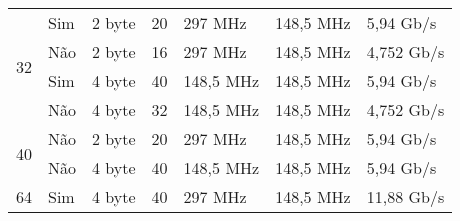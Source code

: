 \begin{table}[h!]
{\begin{tabular}{@{}lllllll@{}}
			\multirow{4}{*}{32}                                                        & Sim                                                                    & 2 byte                                                                  & 20                                                                                 & 297 MHz                & 148,5 MHz               & 5,94 Gb/s                                                               \\
			& Não                                                                    & 2 byte                                                                  & 16                                                                                 & 297 MHz                & 148,5 MHz               & 4,752 Gb/s                                                              \\
			& Sim                                                                    & 4 byte                                                                  & 40                                                                                 & 148,5 MHz              & 148,5 MHz               & 5,94 Gb/s                                                               \\
			& Não                                                                    & 4 byte                                                                  & 32                                                                                 & 148,5 MHz              & 148,5 MHz               & 4,752 Gb/s                                                              \\ \hline
			\multirow{2}{*}{40}                                                        & Não                                                                    & 2 byte                                                                  & 20                                                                                 & 297 MHz                & 148,5 MHz               & 5,94 Gb/s                                                               \\
			& Não                                                                    & 4 byte                                                                  & 40                                                                                 & 148,5 MHz              & 148,5 MHz               & 5,94 Gb/s                                                               \\ \hline
			\multirow{2}{*}{64}                                                        & Sim                                                                    & 4 byte                                                                  & 40                                                                                 & 297 MHz                & 148,5 MHz               & 11,88 Gb/s                                                              \\

\end{tabular}}
\end{table}
